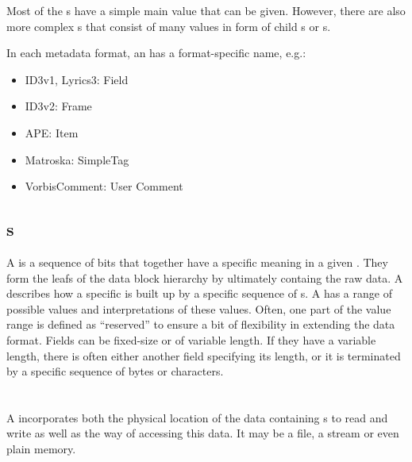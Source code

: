 Most of the \TERMattribute{}s have a simple main value that can be given. However, there are also more complex \TERMattribute{}s that consist of many values in form of child \TERMcontainer{}s or \TERMfield{}s.

In each metadata format, an \TERMattribute{} has a format-specific name, e.g.:
\begin{itemize}
\item ID3v1, Lyrics3: Field
\item ID3v2: Frame
\item APE: Item
\item Matroska: SimpleTag
\item VorbisComment: User Comment
\end{itemize}


\subsection{\TERMfield{}s}
\label{sec:Fields}

A \TERMfield{} is a sequence of bits that together have a specific meaning in a given \TERMdataFormat{}. They form the leafs of the data block hierarchy by ultimately containg the raw data. A \TERMdataFormat{} describes how a specific \TERMdataBlock{} is built up by a specific sequence of \TERMfield{}s. A \TERMfield{} has a range of possible values and
interpretations of these values. Often, one part of the value range is defined as ``reserved'' to ensure a bit of flexibility in extending the data format. Fields can be fixed-size or of variable length. If they have a variable length, there is often either another field specifying its length, or it is terminated by a specific sequence of bytes or characters.


\section{\TERMmedium{}}
\label{sec:Medium}

A \TERMmedium{} incorporates both the physical location of the data containing \TERMdataBlock{}s to read and write as well as the way of accessing this data. It may be a file, a stream or even plain memory.


